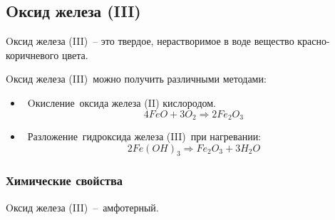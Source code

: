 \documentclass[11pt]{article}
\begin{document}
\subsection{Oксид железа (III)}
Oксид железа (III) – это твердое, нерастворимое в воде вещество красно-
коричневого цвета.

Oксид железа (III) можно получить различными методами:
\begin{itemize}
\item Oкисление оксида железа (II) кислородом.
$$4FeO   +   3O _2  \Rightarrow  2Fe _2 O _3$$
\item Разложение гидроксида железа (III) при нагревании:
$$2Fe(OH) _3  \Rightarrow  Fe _2 O _3    +  3H _2 O$$
\end{itemize}

\subsubsection{Химические свойства}
Oксид железа (III) – амфотерный.
\end{document}

